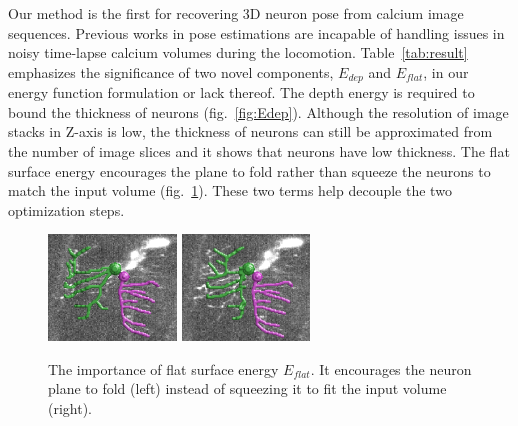 \documentclass{article}
\begin{document}

Our method is the first for recovering 3D neuron pose from calcium image sequences. Previous works \cite{Ferrari2009, Glowacki2017, Gulyanon2018a} in pose estimations are incapable of handling issues in noisy time-lapse calcium volumes during the locomotion. Table~\ref{tab:result} emphasizes the significance of two novel components, $E_{dep}$ and $E_{flat}$, in our energy function formulation or lack thereof. The depth energy is required to bound the thickness of neurons (fig.~\ref{fig:Edep}). Although the resolution of image stacks in Z-axis is low, the thickness of neurons can still be approximated from the number of image slices and it shows that neurons have low thickness. The flat surface energy encourages the plane to fold rather than squeeze the neurons to match the input volume (fig.~\ref{fig:Eflat}). These two terms help decouple the two optimization steps. 

\begin{figure}[t]
	\centering
	\vspace{-10pt}
	\includegraphics[height=80pt]{img/norm1}
	\includegraphics[height=80pt]{img/flat1}
	\vspace{-10pt}
	\caption{\small{The importance of flat surface energy $E_{flat}$. It encourages the neuron plane to fold (left) instead of squeezing it to fit the input volume (right).}}
	\vspace{-10pt}
	\label{fig:Eflat}
\end{figure}
\end{document}
